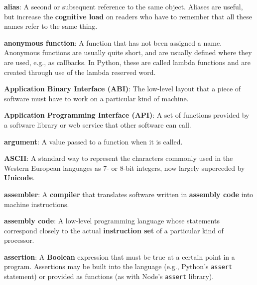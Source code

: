 \documentclass[krantzl]{krantz}
\newcommand{\glosskey}[1]{\textbf{#1}}
\begin{document}
\noindent \textbf{{\newline}\glosskey{alias}}: 
A second or subsequent reference to the same object. Aliases are useful, but increase the \glosskey{cognitive load} on readers who have to remember that all these names refer to the same thing.


\noindent \textbf{{\newline}\glosskey{anonymous function}}: 
A function that has not been assigned a name. Anonymous functions are usually quite short, and are usually defined where they are used, e.g., as callbacks. In Python, these are called lambda functions and are created through use of the lambda reserved word.


\noindent \textbf{{\newline}\glosskey{Application Binary Interface} (ABI)}: 
The low-level layout that a piece of software must have to work on a particular kind of machine.


\noindent \textbf{{\newline}\glosskey{Application Programming Interface} (API)}: 
A set of functions provided by a software library or web service that other software can call.


\noindent \textbf{{\newline}\glosskey{argument}}: 
A value passed to a function when it is called.


\noindent \textbf{{\newline}\glosskey{ASCII}}: 
A standard way to represent the characters commonly used in the Western European languages as 7- or 8-bit integers, now largely superceded by \glosskey{Unicode}.


\noindent \textbf{{\newline}\glosskey{assembler}}: 
A \glosskey{compiler} that translates software written in \glosskey{assembly code} into machine instructions.


\noindent \textbf{{\newline}\glosskey{assembly code}}: 
A low-level programming language whose statements correspond closely to the actual \glosskey{instruction set} of a particular kind of processor.


\noindent \textbf{{\newline}\glosskey{assertion}}: 
A \glosskey{Boolean} expression that must be true at a certain point in a program. Assertions may be built into the language (e.g., Python’s \texttt{assert} statement) or provided as functions (as with Node’s \texttt{assert} library).
\end{document}
